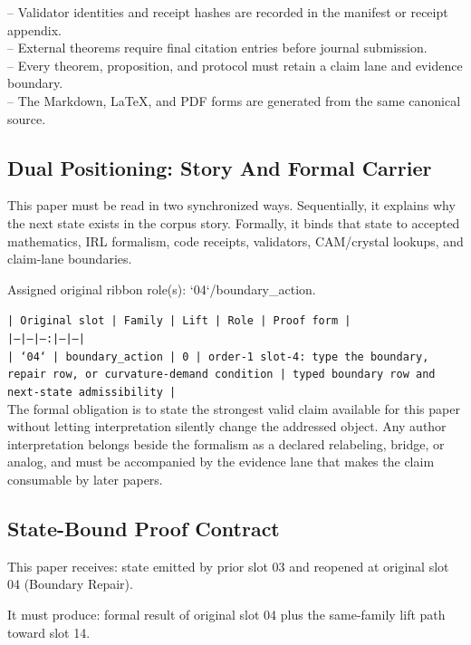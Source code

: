 \documentclass[11pt]{article}
\begin{document}
\noindent{}-- Validator identities and receipt hashes are recorded in the manifest or receipt appendix.\\
\noindent{}-- External theorems require final citation entries before journal submission.\\
\noindent{}-- Every theorem, proposition, and protocol must retain a claim lane and evidence boundary.\\
\noindent{}-- The Markdown, LaTeX, and PDF forms are generated from the same canonical source.\\

\subsection*{Dual Positioning: Story And Formal Carrier}

This paper must be read in two synchronized ways. Sequentially, it explains why
the next state exists in the corpus story. Formally, it binds that state to
accepted mathematics, IRL formalism, code receipts, validators, CAM/crystal
lookups, and claim-lane boundaries.

Assigned original ribbon role(s): `04`/boundary\_action.

\noindent\texttt{| Original slot | Family | Lift | Role | Proof form |}\\
\noindent\texttt{|---|---|---:|---|---|}\\
\noindent\texttt{| `04` | boundary\_action | 0 | order-1 slot-4: type the boundary, repair row, or curvature-demand condition | typed boundary row and next-state admissibility |}\\

The formal obligation is to state the strongest valid claim available for this
paper without letting interpretation silently change the addressed object. Any
author interpretation belongs beside the formalism as a declared relabeling,
bridge, or analog, and must be accompanied by the evidence lane that makes the
claim consumable by later papers.

\subsection*{State-Bound Proof Contract}

This paper receives: state emitted by prior slot 03 and reopened at original slot 04 (Boundary Repair).

It must produce: formal result of original slot 04 plus the same-family lift path toward slot 14.
\end{document}
